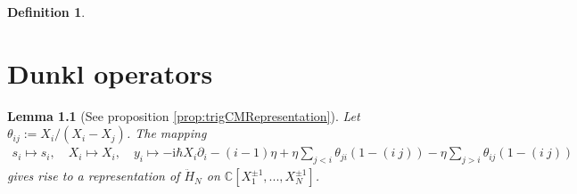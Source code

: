 \documentclass[11pt]{report}
\newtheorem{lemma}[theorem]{Lemma}
\theoremstyle{definition}
\newtheorem{definition}[theorem]{Definition}
\theoremstyle{remark}
\theoremstyle{remark}
\newcommand{\C}{\mathbb{C}}
\newcommand{\I}{\mathrm{i}}
\begin{document}
\begin{definition}
\begin{enumerate}[label=(\roman*)]
\end{enumerate}
\end{definition}

\chapter{Dunkl operators}\label{appendix:dunklOperators}

\begin{lemma}[See proposition \ref{prop:trigCMRepresentation}]\label{lemma:trigCMRepresentationAppendix}
Let $\theta_{ij} := X_i/(X_i-X_j)$. The mapping
\begin{align*}
s_i \mapsto s_i, \quad X_i \mapsto X_i, \quad y_i \mapsto -\I \hbar X_i \partial_i - (i-1) \eta + \eta \sum_{j < i} \theta_{ji} (1-(i \ j)) - \eta \sum_{j > i} \theta_{ij} (1-(i \ j))
\end{align*}
gives rise to a representation of $\ddot H_N$ on $\C[X_1^{\pm 1},...,X_N^{\pm 1}]$.
\end{lemma}
\end{document}
